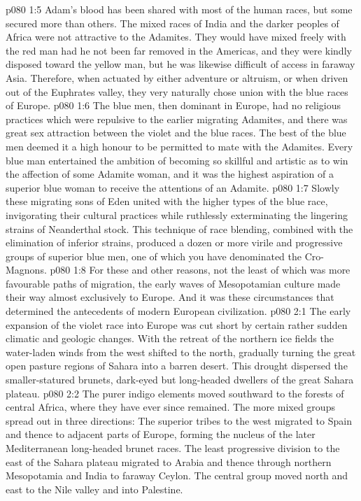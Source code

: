 \vs p080 1:5 Adam’s blood has been shared with most of the human races, but some secured more than others. The mixed races of India and the darker peoples of Africa were not attractive to the Adamites. They would have mixed freely with the red man had he not been far removed in the Americas, and they were kindly disposed toward the yellow man, but he was likewise difficult of access in faraway Asia. Therefore, when actuated by either adventure or altruism, or when driven out of the Euphrates valley, they very naturally chose union with the blue races of Europe.
\vs p080 1:6 The blue men, then dominant in Europe, had no religious practices which were repulsive to the earlier migrating Adamites, and there was great sex attraction between the violet and the blue races. The best of the blue men deemed it a high honour to be permitted to mate with the Adamites. Every blue man entertained the ambition of becoming so skillful and artistic as to win the affection of some Adamite woman, and it was the highest aspiration of a superior blue woman to receive the attentions of an Adamite.
\vs p080 1:7 Slowly these migrating sons of Eden united with the higher types of the blue race, invigorating their cultural practices while ruthlessly exterminating the lingering strains of Neanderthal stock. This technique of race blending, combined with the elimination of inferior strains, produced a dozen or more virile and progressive groups of superior blue men, one of which you have denominated the Cro\hyp{}Magnons.
\vs p080 1:8 For these and other reasons, not the least of which was more favourable paths of migration, the early waves of Mesopotamian culture made their way almost exclusively to Europe. And it was these circumstances that determined the antecedents of modern European civilization.
\vs p080 2:1 The early expansion of the violet race into Europe was cut short by certain rather sudden climatic and geologic changes. With the retreat of the northern ice fields the water\hyp{}laden winds from the west shifted to the north, gradually turning the great open pasture regions of Sahara into a barren desert. This drought dispersed the smaller\hyp{}statured brunets, dark\hyp{}eyed but long\hyp{}headed dwellers of the great Sahara plateau.
\vs p080 2:2 The purer indigo elements moved southward to the forests of central Africa, where they have ever since remained. The more mixed groups spread out in three directions: The superior tribes to the west migrated to Spain and thence to adjacent parts of Europe, forming the nucleus of the later Mediterranean long\hyp{}headed brunet races. The least progressive division to the east of the Sahara plateau migrated to Arabia and thence through northern Mesopotamia and India to faraway Ceylon. The central group moved north and east to the Nile valley and into Palestine.
